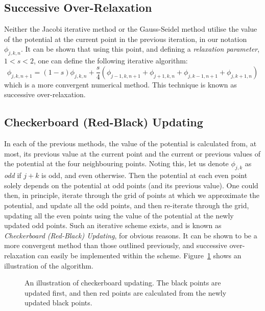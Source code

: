 \documentclass[12pt, a4paper]{article}
\newcommand{\be}{\begin{equation}}
\newcommand{\ee}{\end{equation}}
\begin{document}
\subsection{Successive Over-Relaxation}

Neither the Jacobi iterative method or the Gauss-Seidel method utilise the value
of the potential at the current point in the previous iteration, in our notation
$\phi_{j,k,n}$. It can be shown that using this point, and defining a
\emph{relaxation parameter}, $1<s<2$, one can define the following iterative algorithm:
%
\be
\phi_{j,k,n+1}= (1-s)\phi_{j,k,n}+\frac{s}{4}(\phi_{j-1,k,n+1}+\phi_{j+1,k,n}+\phi_{j,k-1,n+1}+\phi_{j,k+1,n})
\ee
%
which is a more convergent numerical method. This technique is known as successive
over-relaxation.


\subsection{Checkerboard (Red-Black) Updating}

In each of the previous methods, the value of the potential is calculated from, at most,
its previous value at the current point and the current or previous values of the
potential at the four neighbouring points. Noting this, let us denote $\phi_{j,k}$ as
\emph{odd} if $j+k$ is odd, and even otherwise. Then the potential at each even point
solely depends on the potential at odd points (and its previous value). One could then,
in principle, iterate through the grid of points at which we approximate the potential,
and update all the odd points, and then re-iterate through the grid, updating all the
even points using the value of the potential at the newly updated odd points. Such an
iterative scheme exists, and is known as \emph{Checkerboard (Red-Black) Updating}, for
obvious reasons. It can be shown to be a more convergent method than those outlined
previously, and successive over-relaxation can easily be implemented within the scheme.
Figure~\ref{fig:checker} shows an illustration of the algorithm.

\begin{figure}[h!]
\begin{center}
\end{center}
\caption{An illustration of checkerboard updating. The black points are updated first,
and then red points are calculated from the newly updated black points.}
\label{fig:checker}
\end{figure}
\end{document}
